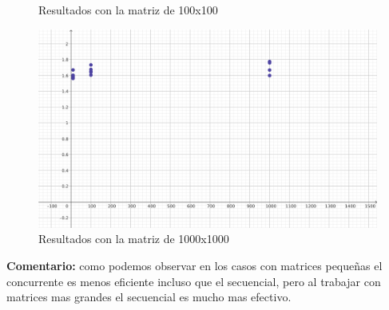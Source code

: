 \documentclass[12pt]{extarticle} %
\begin{document}
\begin{enumerate}
\begin{enumerate}
\begin{figure}[htbp]
        \caption{Resultados con la matriz de 100x100}
        \label{fig:enter-label} 
        \end{figure}
        \newpage
        \begin{figure}[htbp]
            \centering
        \includegraphics[scale=0.5]{images/M1000.png}
        \caption{Resultados con la matriz de 1000x1000}
        \label{fig:enter-label} 
        \end{figure}
        \textbf{Comentario:} como podemos observar en los casos con matrices pequeñas el concurrente es menos eficiente incluso que el secuencial, pero al trabajar con matrices mas grandes el secuencial es mucho mas efectivo.
        

\end{enumerate}
\end{enumerate}
\end{document}
